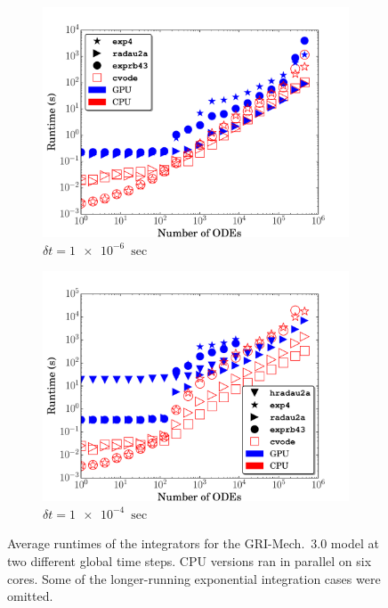 \documentclass[preprint]{elsarticle}
\begin{document}
\begin{figure}[htb]
  \centering
  \begin{subfigure}{0.49\textwidth}
      \includegraphics[width=\linewidth]{GRI_1e-06_cpuvsgpu.pdf}
      \caption{$\delta t = \SI{1e-6}{\sec}$}
  \end{subfigure}
  \begin{subfigure}{0.49\textwidth}
      \includegraphics[width=\linewidth]{GRI_1e-04_cpuvsgpu.pdf}
      \caption{$\delta t = \SI{1e-4}{\sec}$}
  \end{subfigure}
  \caption{Average runtimes of the integrators for the GRI-Mech.~3.0 model at two different global time steps. 
  CPU versions ran in parallel on six cores.
  Some of the longer-running exponential integration cases were omitted.}
  \label{F:GRI_perf}
\end{figure}
\end{document}
